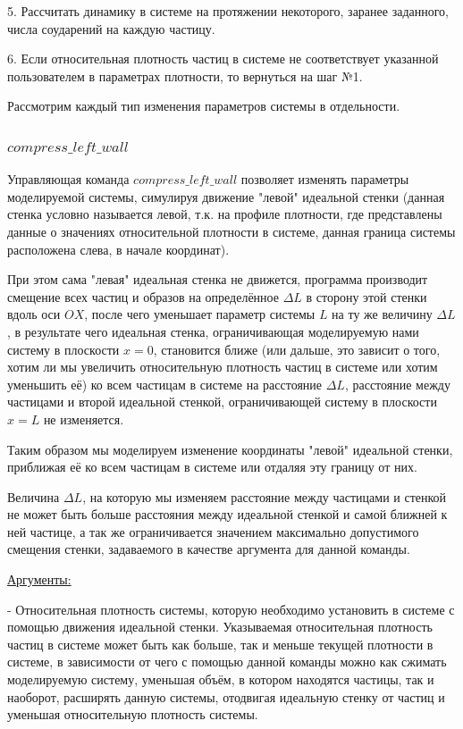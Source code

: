 \documentclass{article}
\begin{document}
5. Рассчитать динамику в системе на протяжении некоторого, заранее заданного, числа соударений на каждую частицу.

6. Если относительная плотность частиц в системе не соответствует указанной пользователем в параметрах плотности, то вернуться на шаг №1.

Рассмотрим каждый тип изменения параметров системы в отдельности.

\subsubsection{$ compress\_left\_wall $}
Управляющая команда $ compress\_left\_wall $ позволяет изменять параметры моделируемой системы, симулируя движение "левой" идеальной стенки (данная стенка условно называется левой, т.к. на профиле плотности, где представлены данные о значениях относительной плотности в системе, данная граница системы расположена слева, в начале координат).

При этом сама "левая" идеальная стенка не движется, программа производит смещение всех частиц и образов на определённое $ \Delta L $ в сторону этой стенки вдоль оси $ OX $, после чего уменьшает параметр системы $ L $ на ту же величину $ \Delta L $, в результате чего идеальная стенка, ограничивающая моделируемую нами систему в плоскости $ x = 0 $, становится ближе (или дальше, это зависит о того, хотим ли мы увеличить относительную плотность частиц в системе или хотим уменьшить её) ко всем частицам в системе на расстояние $ \Delta L $, расстояние между частицами и второй идеальной стенкой, ограничивающей систему в плоскости $ x = L $ не изменяется.

Таким образом мы моделируем изменение координаты "левой" идеальной стенки, приближая её ко всем частицам в системе или отдаляя эту границу от них.

Величина $ \Delta L $, на которую мы изменяем расстояние между частицами и стенкой не может быть больше расстояния между идеальной стенкой и самой ближней к ней частице, а так же ограничивается значением максимально допустимого смещения стенки, задаваемого в качестве аргумента для данной команды.

\uline{Аргументы:}

- Относительная плотность системы, которую необходимо установить в системе с помощью движения идеальной стенки. Указываемая относительная плотность частиц в системе может быть как больше, так и меньше текущей плотности в системе, в зависимости от чего с помощью данной команды можно как сжимать моделируемую систему, уменьшая объём, в котором находятся частицы, так и наоборот, расширять данную системы, отодвигая идеальную стенку от частиц и уменьшая относительную плотность системы.
\end{document}
